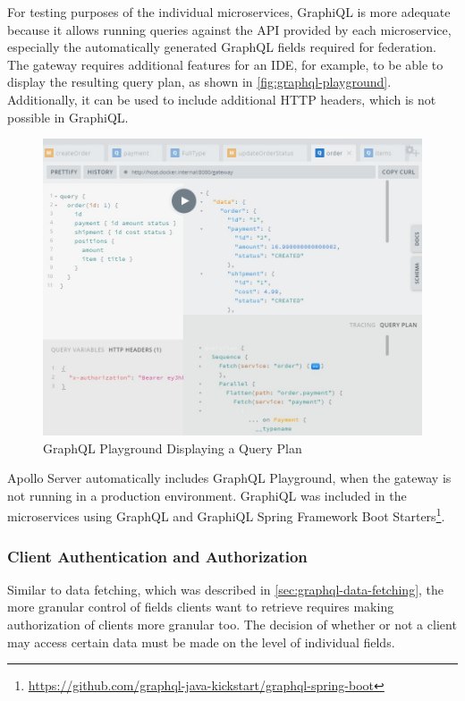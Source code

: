 For testing purposes of the individual microservices, GraphiQL is more adequate because it allows running queries against the \ac{API} provided by each microservice, especially the automatically generated GraphQL fields required for federation.
The gateway requires additional features for an \ac{IDE}, for example, to be able to display the resulting query plan, as shown in \autoref{fig:graphql-playground}.
Additionally, it can be used to include additional \ac{HTTP} headers, which is not possible in GraphiQL.%

\begin{figure}[h!]
    \centering
    \includegraphics[width=\textwidth]{images/graphql-playground.png}
    \caption{GraphQL Playground Displaying a Query Plan}\label{fig:graphql-playground}
\end{figure}

Apollo Server automatically includes GraphQL Playground, when the gateway is not running in a production environment.
GraphiQL was included in the microservices using GraphQL and GraphiQL Spring Framework Boot Starters\footnote{\url{https://github.com/graphql-java-kickstart/graphql-spring-boot}}.

\subsubsection{Client Authentication and Authorization}\label{sec:graphql-auth}

Similar to data fetching, which was described in \autoref{sec:graphql-data-fetching}, the more granular control of fields clients want to retrieve requires making authorization of clients more granular too.
The decision of whether or not a client may access certain data must be made on the level of individual fields.

